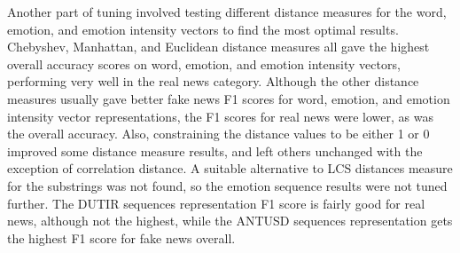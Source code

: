 \documentclass [11pt, proquest] {uwthesis}[2020/02/24]
\begin{document}
Another part of tuning involved testing different distance measures for the word, emotion, and emotion intensity vectors to find the most optimal results. Chebyshev, Manhattan, and Euclidean distance measures all gave the highest overall accuracy scores on word, emotion, and emotion intensity vectors, performing very well in the real news category. Although the other distance measures usually gave better fake news F1 scores for word, emotion, and emotion intensity vector representations, the F1 scores for real news were lower, as was the overall accuracy. Also, constraining the distance values to be either 1 or 0 improved some distance measure results, and left others unchanged with the exception of correlation distance. A suitable alternative to LCS distances measure for the substrings was not found, so the emotion sequence results were not tuned further. The DUTIR sequences representation F1 score is fairly good for real news, although not the highest, while the ANTUSD sequences representation gets the highest F1 score for fake news overall. 
\end{document}
